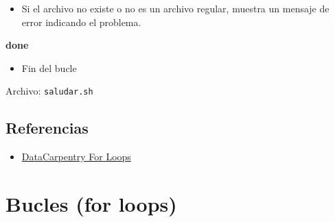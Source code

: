 \documentclass[
  spanish,
  12pt,
  letterpaper,
  DIV=11,
  numbers=noendperiod]{scrreprt}
\newenvironment{Shaded}{\begin{snugshade}}{\end{snugshade}}
\newcommand{\BuiltInTok}[1]{\textcolor[rgb]{0.00,0.23,0.31}{#1}}
\newcommand{\CommentTok}[1]{\textcolor[rgb]{0.37,0.37,0.37}{#1}}
\newcommand{\ControlFlowTok}[1]{\textcolor[rgb]{0.00,0.23,0.31}{\textbf{#1}}}
\newcommand{\KeywordTok}[1]{\textcolor[rgb]{0.00,0.23,0.31}{\textbf{#1}}}
\newcommand{\NormalTok}[1]{\textcolor[rgb]{0.00,0.23,0.31}{#1}}
\newcommand{\OperatorTok}[1]{\textcolor[rgb]{0.37,0.37,0.37}{#1}}
\newcommand{\OtherTok}[1]{\textcolor[rgb]{0.00,0.23,0.31}{#1}}
\newcommand{\StringTok}[1]{\textcolor[rgb]{0.13,0.47,0.30}{#1}}
\newcommand{\VariableTok}[1]{\textcolor[rgb]{0.07,0.07,0.07}{#1}}
\providecommand{\tightlist}{%
  \setlength{\itemsep}{0pt}\setlength{\parskip}{0pt}}
\begin{document}
\begin{tcolorbox}
\begin{itemize}
\tightlist
\item
  Si el archivo no existe o no es un archivo regular, muestra un mensaje
  de error indicando el problema.
\end{itemize}

\begin{Shaded}
\begin{Highlighting}[]
\ControlFlowTok{done}
\end{Highlighting}
\end{Shaded}

\begin{itemize}
\tightlist
\item
  Fin del bucle
\end{itemize}

\end{tcolorbox}

Archivo: \texttt{saludar.sh}

\begin{Shaded}
\end{Shaded}

\section{Referencias}\label{referencias-9}

\begin{itemize}
\tightlist
\item
  \href{https://datacarpentry.github.io/semester-biology/materials/for-loops-indexing/}{DataCarpentry
  For Loops}
\end{itemize}

\chapter{Bucles (for loops)}\label{bucles-for-loops}
\end{document}
